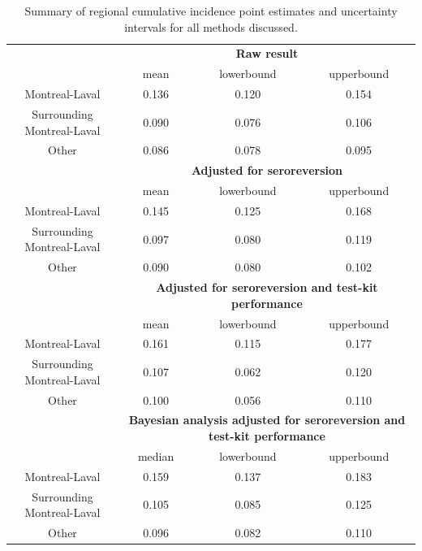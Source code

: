 \begin{table}[]
\centering
\label{tab:results}
\begin{tabular}{c|ccc}
                           & \multicolumn{3}{c}{\textbf{Raw result}}                                        \\
                           & mean                & lowerbound             & upperbound             \\
Montreal-Laval             & 0.136               & 0.120                  & 0.154                  \\
Surrounding Montreal-Laval & 0.090               & 0.076                  & 0.106                  \\
Other                      & 0.086               & 0.078                  & 0.095                  \\
\hline
                           & \multicolumn{3}{c}{\textbf{Adjusted for seroreversion}}                          \\
                           & mean                & lowerbound             & upperbound             \\
Montreal-Laval             & 0.145               & 0.125                  & 0.168                  \\
Surrounding Montreal-Laval & 0.097               & 0.080                  & 0.119                  \\
Other                      & 0.090               & 0.080                  & 0.102                  \\
\hline
                           & \multicolumn{3}{c}{\textbf{Adjusted for seroreversion and test-kit performance}} \\
                           & mean                & lowerbound             & upperbound             \\
Montreal-Laval             & 0.161               & 0.115                  & 0.177                  \\
Surrounding Montreal-Laval & 0.107               & 0.062                  & 0.120                  \\
Other                      & 0.100               & 0.056                  & 0.110                  \\
\hline
                           & \multicolumn{3}{c}{\textbf{Bayesian analysis adjusted for seroreversion and test-kit performance}}                                 \\
                           & median              & lowerbound             & upperbound             \\
Montreal-Laval             & 0.159               & 0.137                  & 0.183                  \\
Surrounding Montreal-Laval & 0.105               & 0.085                  & 0.125                  \\
Other                      & 0.096               & 0.082                  & 0.110                 
\end{tabular}
\caption{Summary of regional cumulative incidence point estimates and uncertainty intervals for all methods discussed.}
\end{table}

